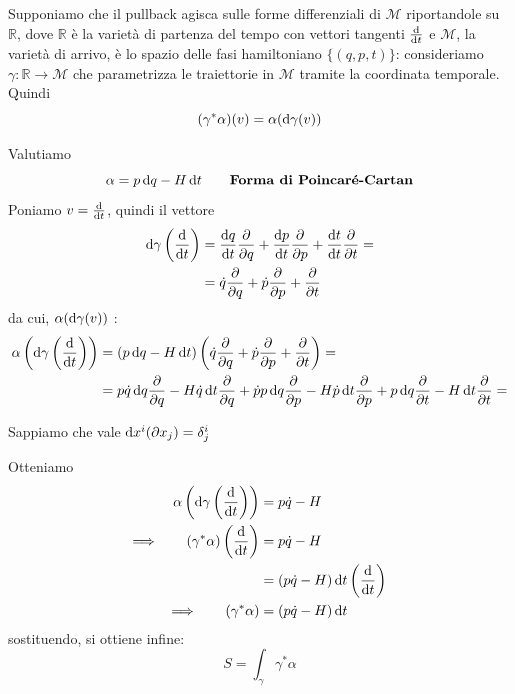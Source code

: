 Supponiamo che il pullback agisca sulle forme differenziali di $\mathcal{M}$ riportandole su $\mathbb{R}$, dove $\mathbb{R}$ è la varietà di partenza del tempo con vettori tangenti $\odv{}{t}$ e $\mathcal{M}$, la varietà di arrivo, è lo spazio delle fasi hamiltoniano $\{ (q, p, t) \}$: consideriamo $\gamma : \mathbb{R} \longrightarrow \mathcal{M}$ che parametrizza le traiettorie in $\mathcal{M}$ tramite la coordinata temporale.
Quindi
\[
    (\gamma^* \alpha) (v) = \alpha (\odif{\gamma}(v))
\]

Valutiamo
\begin{equation}
    \alpha = p \odif{q} - H \odif{t} \tag*{\textbf{Forma di Poincaré-Cartan}}
\end{equation}
Poniamo $v = \odv{}{t}$, quindi il vettore
\begin{align*}
    \odif{\gamma} \left( \odv{}{t} \right) & = \odv{q}{t} \pdv{}{q} + \odv{p}{t} \pdv{}{p} + \odv{t}{t} \pdv{}{t} = \\
                                           & = \dot q \pdv{}{q} + \dot p \pdv{}{p} + \pdv{}{t}
\end{align*}
da cui, $\alpha (\odif{\gamma}(v))$ :
\begin{align*}
    \alpha\left(\odif{\gamma}\left(\odv{}{t}\right)\right) & = (p \odif{q} - H \odif{t}) \left( \dot q \pdv{}{q} + \dot p \pdv{}{p} + \pdv{}{t} \right) =                                                                            \\
                                                           & = p \dot q \odif{q} \pdv{}{q} - H \dot q \odif{t} \pdv{}{q} + \dot p p \odif{q} \pdv{}{p} - H \dot p \odif{t} \pdv{}{p} + p \odif{q} \pdv{}{t} - H \odif{t} \pdv{}{t} =
\end{align*}

\begin{remark}
    Sappiamo che vale $\odif{x^i}(\partial x_j) = \delta^i_j$
\end{remark}
Otteniamo
\begin{align*}
    \alpha \left( \odif{\gamma} \left( \odv{}{t} \right) \right)                   & = p \dot q - H                                     \\
    \Longrightarrow \qquad \left( \gamma^* \alpha \right) \left( \odv{}{t} \right) & = p \dot q - H                                     \\
                                                                                   & = (p \dot q - H) \odif{t} \left( \odv{}{t} \right) \\
    \Longrightarrow \qquad \left( \gamma^* \alpha \right)                          & = (p \dot q - H) \odif{t}
\end{align*}
sostituendo, si ottiene infine:
\begin{equation}
    S = \int_\gamma \gamma^* \alpha
\end{equation}